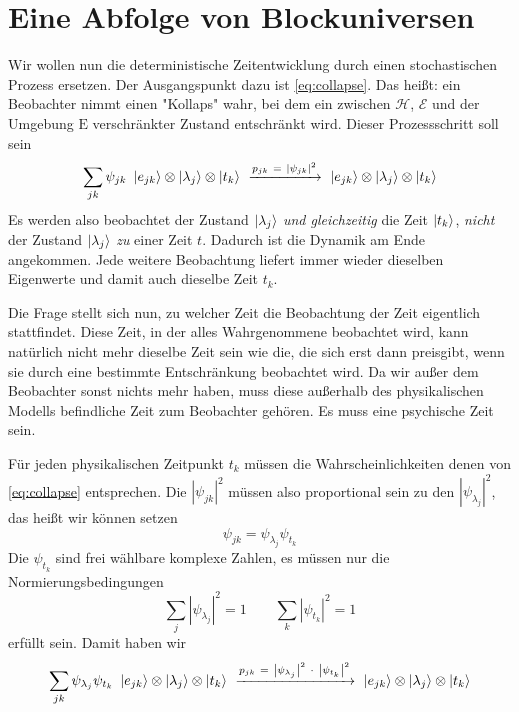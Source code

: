 \documentclass[12pt]{article}
\begin{document}

\section{Eine Abfolge von Blockuniversen}

Wir wollen nun die deterministische Zeitentwicklung durch einen stochastischen Prozess ersetzen. Der Ausgangspunkt dazu ist \eqref{eq:collapse}. Das heißt: ein Beobachter nimmt einen "Kollaps" wahr, bei dem ein zwischen $\mathscr{H}$, $\mathscr{E}$ und der Umgebung $\mathrm{E}$ verschränkter Zustand entschränkt wird. Dieser Prozessschritt soll sein
\begin{equation*} 
\sum_{jk} \psi_{jk}\ \ket{e_{jk}} \otimes \ket{\lambda_j} \otimes \ket{t_k} 
\ \xrightarrow{p_{jk}\ =\ \left|\psi_{jk}\right|^2}\ 
\ket{e_{jk}} \otimes \ket{\lambda_j} \otimes \ket{t_k}
\end{equation*}
Es werden also beobachtet der Zustand $\ket{\lambda_j}$ \emph{und gleichzeitig} die Zeit $\ket{t_k}$, \emph{nicht} der Zustand $\ket{\lambda_j}$ \emph{zu} einer Zeit $t$. Dadurch ist die Dynamik am Ende angekommen. Jede weitere Beobachtung liefert immer wieder dieselben Eigenwerte und damit auch dieselbe Zeit $t_k$. 

Die Frage stellt sich nun, zu welcher Zeit die Beobachtung der Zeit eigentlich stattfindet. Diese Zeit, in der alles Wahrgenommene beobachtet wird, kann natürlich nicht mehr dieselbe Zeit sein wie die, die sich erst dann preisgibt, wenn sie durch eine bestimmte Entschränkung beobachtet wird. Da wir außer dem Beobachter sonst nichts mehr haben, muss diese außerhalb des physikalischen Modells befindliche Zeit zum Beobachter gehören. Es muss eine psychische Zeit sein.

Für jeden physikalischen Zeitpunkt $t_k$ müssen die Wahrscheinlichkeiten denen von \eqref{eq:collapse} entsprechen. Die $\left|\psi_{jk}\right|^2$ müssen also proportional sein zu den $\left|\psi_{\lambda_j}\right|^2$, das heißt wir können setzen
\begin{equation*}
\psi_{jk} =  \psi_{\lambda_j} \psi_{t_k}
\end{equation*}
Die $\psi_{t_k}$ sind frei wählbare komplexe Zahlen, es müssen nur die Normierungsbedingungen
\begin{equation*}
\sum_j \left|\psi_{\lambda_j}\right|^2 = 1 \quad\quad
\sum_{k} \left|\psi_{t_k}\right|^2 = 1
\end{equation*}
erfüllt sein. Damit haben wir 
\begin{equation} 
\label{eq:collapse_with_time}
\sum_{jk} \psi_{\lambda_j}\psi_{t_k} \ \ket{e_{jk}} \otimes \ket{\lambda_j} \otimes \ket{t_k} 
\ \xrightarrow{p_{jk}\ =\ \left|\psi_{\lambda_j}\right|^2\ \cdot\ \left|\psi_{t_k}\right|^2}\ 
\ket{e_{jk}} \otimes \ket{\lambda_j} \otimes \ket{t_k}
\end{equation}
\end{document}
